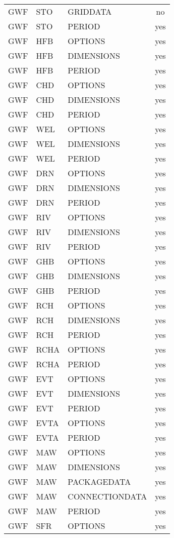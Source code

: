 \begin{longtable}{p{1.5cm} p{1.5cm} p{3cm} c}
GWF & STO & GRIDDATA & no \\ 
GWF & STO & PERIOD & yes \\ 
\hline
GWF & HFB & OPTIONS & yes \\ 
GWF & HFB & DIMENSIONS & yes \\ 
GWF & HFB & PERIOD & yes \\ 
\hline
GWF & CHD & OPTIONS & yes \\ 
GWF & CHD & DIMENSIONS & yes \\ 
GWF & CHD & PERIOD & yes \\ 
\hline
GWF & WEL & OPTIONS & yes \\ 
GWF & WEL & DIMENSIONS & yes \\ 
GWF & WEL & PERIOD & yes \\ 
\hline
GWF & DRN & OPTIONS & yes \\ 
GWF & DRN & DIMENSIONS & yes \\ 
GWF & DRN & PERIOD & yes \\ 
\hline
GWF & RIV & OPTIONS & yes \\ 
GWF & RIV & DIMENSIONS & yes \\ 
GWF & RIV & PERIOD & yes \\ 
\hline
GWF & GHB & OPTIONS & yes \\ 
GWF & GHB & DIMENSIONS & yes \\ 
GWF & GHB & PERIOD & yes \\ 
\hline
GWF & RCH & OPTIONS & yes \\ 
GWF & RCH & DIMENSIONS & yes \\ 
GWF & RCH & PERIOD & yes \\ 
\hline
GWF & RCHA & OPTIONS & yes \\ 
GWF & RCHA & PERIOD & yes \\ 
\hline
GWF & EVT & OPTIONS & yes \\ 
GWF & EVT & DIMENSIONS & yes \\ 
GWF & EVT & PERIOD & yes \\ 
\hline
GWF & EVTA & OPTIONS & yes \\ 
GWF & EVTA & PERIOD & yes \\ 
\hline
GWF & MAW & OPTIONS & yes \\ 
GWF & MAW & DIMENSIONS & yes \\ 
GWF & MAW & PACKAGEDATA & yes \\ 
GWF & MAW & CONNECTIONDATA & yes \\ 
GWF & MAW & PERIOD & yes \\ 
\hline
GWF & SFR & OPTIONS & yes \\ 

\end{longtable}
